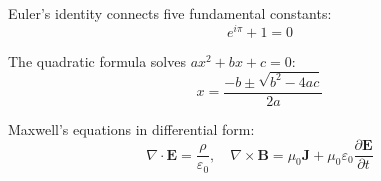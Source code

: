 Euler's identity connects five fundamental constants:
\[
    e^{i\pi} + 1 = 0
\]

The quadratic formula solves $ax^2 + bx + c = 0$:
\[
    x = \frac{-b \pm \sqrt{b^2 - 4ac}}{2a}
\]

Maxwell's equations in differential form:
\[
    \nabla \cdot \mathbf{E} = \frac{\rho}{\varepsilon_0}, \quad
    \nabla \times \mathbf{B} = \mu_0 \mathbf{J} + \mu_0 \varepsilon_0 \frac{\partial \mathbf{E}}{\partial t}
\]
